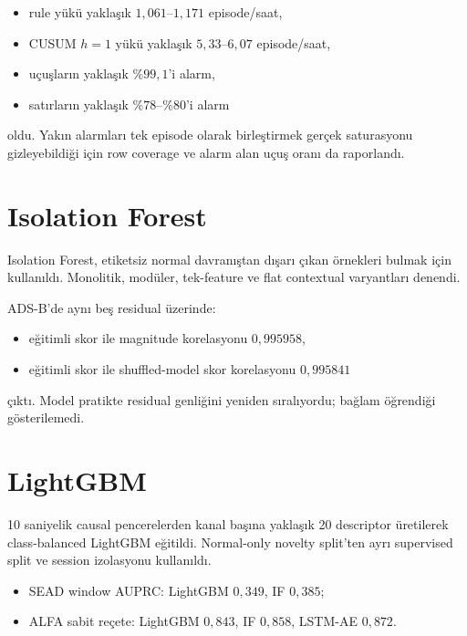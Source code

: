 \documentclass[11pt,a4paper,oneside]{report}
\begin{document}
\begin{itemize}
  \item rule yükü yaklaşık \(1{,}061\)--\(1{,}171\) episode/saat,
  \item CUSUM \(h=1\) yükü yaklaşık \(5{,}33\)--\(6{,}07\) episode/saat,
  \item uçuşların yaklaşık \(\%99{,}1\)'i alarm,
  \item satırların yaklaşık \(\%78\)--\(\%80\)'i alarm
\end{itemize}

oldu. Yakın alarmları tek episode olarak birleştirmek gerçek saturasyonu
gizleyebildiği için row coverage ve alarm alan uçuş oranı da raporlandı.

\section{Isolation Forest}

Isolation Forest, etiketsiz normal davranıştan dışarı çıkan örnekleri bulmak
için kullanıldı. Monolitik, modüler, tek-feature ve flat contextual
varyantları denendi.

ADS-B'de aynı beş residual üzerinde:

\begin{itemize}
  \item eğitimli skor ile magnitude korelasyonu \(0{,}995958\),
  \item eğitimli skor ile shuffled-model skor korelasyonu \(0{,}995841\)
\end{itemize}

çıktı. Model pratikte residual genliğini yeniden sıralıyordu; bağlam
öğrendiği gösterilemedi.

\section{LightGBM}

10 saniyelik causal pencerelerden kanal başına yaklaşık 20 descriptor
üretilerek class-balanced LightGBM eğitildi. Normal-only novelty split'ten
ayrı supervised split ve session izolasyonu kullanıldı.

\begin{itemize}
  \item SEAD window AUPRC: LightGBM \(0{,}349\), IF \(0{,}385\);
  \item ALFA sabit reçete: LightGBM \(0{,}843\), IF \(0{,}858\),
  LSTM-AE \(0{,}872\).
\end{itemize}
\end{document}
